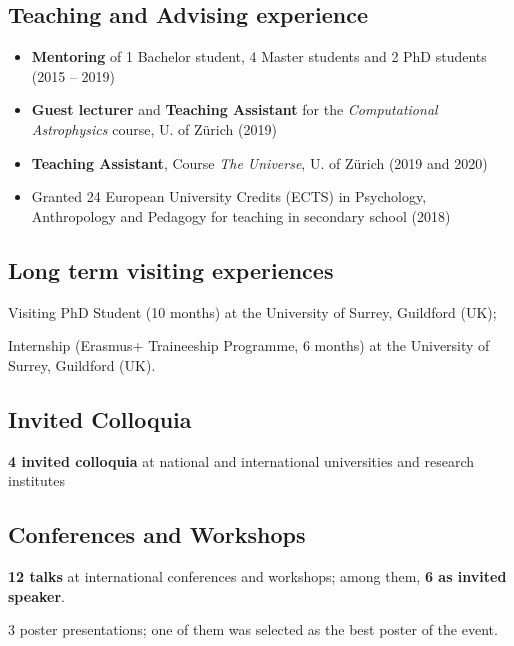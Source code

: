 \subsection*{{Teaching and Advising experience}}
\begin{itemize}[leftmargin=3.5mm]
\setlength\itemsep{-2pt}
\item
\textbf{Mentoring} of 1 Bachelor student, 4 Master students and 2 PhD students (2015 -- 2019)
\item \textbf{Guest lecturer} and \textbf{Teaching Assistant } for the  \textit{Computational Astrophysics} course, U. of Z\"urich (2019)
\item
\textbf{Teaching Assistant}, Course \textit{The Universe}, U. of Z\"urich (2019 and 2020)
\item Granted 24 European University Credits (ECTS)  in Psychology, Anthropology and
Pedagogy for teaching in secondary school (2018)
\end{itemize}


\subsection*{{Long term visiting experiences}}
\begin{description}
\setlength\itemsep{-2pt}
\item[\normalfont 2017:] {Visiting PhD Student} (10 months) at the {University of Surrey}, Guildford (UK);
\item[\normalfont 2015:] {Internship} (Erasmus+ Traineeship Programme, 6 months) at the {University of Surrey}, Guildford (UK).
\end{description}

\subsection*{{Invited Colloquia}}
\begin{description}
\setlength\itemsep{-2pt}
\item[\normalfont 2017 -- 2019:] \textbf{4 invited colloquia} at national and international universities and research institutes
\end{description}


\subsection*{Conferences and Workshops}
\begin{description}
\setlength\itemsep{-2pt}
\item \textbf{12 talks} at international conferences and workshops; among them, \textbf{6 as invited speaker}.
\item 3 poster presentations; one of them was selected as the best poster of the event.
\end{description}


